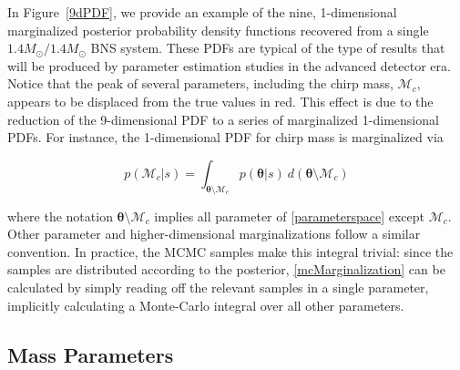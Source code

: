 \documentclass[11pt,a4paper]{emulateapj} 
\newcommand{\thpara}{\boldsymbol{\theta}}
\newcommand{\chmass}{\mathcal{M}_c}
\begin{document}
In Figure~\ref{9dPDF}, we provide an example of the nine,
1-dimensional marginalized posterior probability density functions
recovered from a single $1.4M_{\odot}/1.4M_{\odot}$ BNS system.  These
PDFs are typical of the type of results that will be produced by
parameter estimation studies in the advanced detector era.  Notice
that the peak of several parameters, including the chirp mass,
$\chmass$, appears to be displaced from the true values in red.  This
effect is due to the reduction of the 9-dimensional PDF to a series of
marginalized 1-dimensional PDFs.  For instance, the 1-dimensional PDF
for chirp mass is marginalized via

\begin{equation}
p(\chmass | s) = \int _{\thpara \setminus \chmass} p(\thpara |
s)~d(\thpara \setminus \chmass)
\label{mcMarginalization}
\end{equation}

\noindent where the notation $\thpara \setminus \chmass$ implies all
parameter of \eqref{parameterspace} except $\chmass$.  Other parameter
and higher-dimensional marginalizations follow a similar convention.
In practice, the MCMC samples make this integral trivial: since the
samples are distributed according to the posterior,
\eqref{mcMarginalization} can be calculated by simply reading off the
relevant samples in a single parameter, implicitly calculating a
Monte-Carlo integral over all other parameters.



\subsection{Mass Parameters}
\label{massSection}
\end{document}
